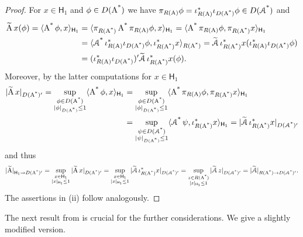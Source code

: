 \documentclass[a4paper]{amsart}
\renewcommand{\H}{\mathsf{H}}
\begin{document}
\begin{proof}
For $x\in\H_{1}$ and $\phi\in D(\operatorname{\operatorname{A}^{*}})$ we have 
$\pi_{R(\operatorname{A})}\phi=\iota_{R(\operatorname{A})}^{*}\iota_{D(\operatorname{\operatorname{A}^{*}})}\phi\in D(\operatorname{\operatorname{\mathcal{A}}^{*}})$ and
\begin{align*}
\widetilde{\A}\,x(\phi)
=\scp{\As\phi}{x}_{\H_{1}}
&=\scp{\pi_{R(\As)}\As\pi_{R(\A)}\phi}{x}_{\H_{1}}
=\scp{\As\pi_{R(\A)}\phi}{\pi_{R(\As)}x}_{\H_{1}}\\
&=\scp{\cAs\iota_{R(\A)}^{*}\iota_{D(\As)}\phi}{\iota_{R(\As)}^{*}x}_{R(\As)}
=\widetilde{\cA}\,\iota_{R(\As)}^{*}x(\iota_{R(\A)}^{*}\iota_{D(\As)}\phi)\\
&=(\iota_{R(\A)}^{*}\iota_{D(\As)})'\widetilde{\cA}\,\iota_{R(\As)}^{*}x(\phi).
\end{align*}
Moreover, by the latter computations for $x\in\H_{1}$
\begin{align*}
|\widetilde{\A}\,x|_{D(\As)'}
=\sup_{\substack{\phi\in D(\As)\\|\phi|_{D(\As)}\leq1}}\scp{\As\phi}{x}_{\H_{1}}
&=\sup_{\substack{\phi\in D(\As)\\|\phi|_{D(\As)}\leq1}}\scp{\As\pi_{R(\A)}\phi}{\pi_{R(\As)}x}_{\H_{1}}\\
&=\sup_{\substack{\psi\in D(\cAs)\\|\psi|_{D(\As)}\leq1}}\scp{\cAs\psi}{\iota_{R(\As)}^{*}x}_{\H_{1}}
=|\widetilde{\cA}\,\iota_{R(\As)}^{*}x|_{D(\cAs)'}
\end{align*}
and thus 
\begin{align*}
|\widetilde{\A}|_{\H_{1}\to D(\As)'}
=\sup_{\substack{x\in\H_{1}\\|x|_{\H_{1}}\leq1}}|\widetilde{\A}\,x|_{D(\As)'}
=\sup_{\substack{x\in\H_{1}\\|x|_{\H_{1}}\leq1}}|\widetilde{\cA}\,\iota_{R(\As)}^{*}x|_{D(\cAs)'}
=\sup_{\substack{z\in R(\As)\\|z|_{\H_{1}}\leq1}}|\widetilde{\cA}\,z|_{D(\cAs)'}
=|\widetilde{\cA}|_{R(\As)\to D(\cAs)'}.
\end{align*}
The assertions in (ii) follow analogously.
\end{proof}

The next result from \cite{waurick2018a} is crucial for the further considerations.
We give a slightly modified version.
\end{document}
